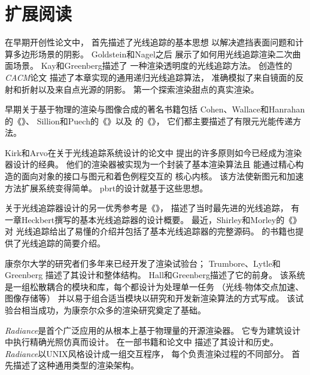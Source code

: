 \section{扩展阅读}\label{sec:扩展阅读1}

在早期开创性论文中，
\citet{10.1145/1468075.1468082}首先描述了光线追踪的基本思想
以解决遮挡表面问题和计算多边形场景的阴影。
Goldstein和Nagel\parencite*{doi:10.1177/003754977101600104}之后
展示了如何用光线追踪渲染二次曲面场景。
Kay和Greenberg\parencite*{10.1145/800249.807438}描述了
一种渲染透明度的光线追踪方法。
\citet{10.1145/358876.358882}创造性的\emph{CACM}论文
描述了本章实现的通用递归光线追踪算法，
准确模拟了来自镜面的反射和折射以及来自点光源的阴影。
\citet{10.1145/37402.37411}第一个探索渲染甜点的真实渲染。

早期关于基于物理的渲染与图像合成的著名书籍包括
Cohen、Wallace和Hanrahan的《》\parencite*{10.5555/154731}、
Sillion和Puech的《》\parencite*{10.5555/561383}以及
\citeauthor{10.5555/200607}的《》\parencite*{10.5555/200607}，
它们都主要描述了有限元光能传递方法。

Kirk和Arvo\parencite*{Kirk88theray}在关于光线追踪系统设计的论文中
提出的许多原则如今已经成为渲染器设计的经典。
他们的渲染器被实现为一个封装了基本渲染算法且
能通过精心构造的面向对象的接口与图元和着色例程交互的
核心内核。
该方法使新图元和加速方法扩展系统变得简单。
pbrt的设计就基于这些思想。

关于光线追踪器设计的另一优秀参考是《》\citep{10.5555/94788}，
描述了当时最先进的光线追踪，
有一章Heckbert撰写的基本光线追踪器的设计概要。
最近，Shirley和Morley的《》\parencite*{10.5555/940410}对
光线追踪给出了易懂的介绍并包括了基本光线追踪器的完整源码。
\citet{10.5555/1324795}的书籍也提供了光线追踪的简要介绍。

康奈尔大学的研究者们多年来已经开发了渲染试验台；
Trumbore、Lytle和Greenberg\parencite*{egtp.19911035}
描述了其设计和整体结构。
Hall和Greenberg\parencite*{4037684}描述了它的前身。
该系统是一组松散耦合的模块和库，每个都设计为处理单一任务
（光线-物体交点加速、图像存储等）
并以易于组合适当模块以研究和开发新渲染算法的方式写成。
该试验台相当成功，为康奈尔众多的渲染研究奠定了基础。

\emph{Radiance}是首个广泛应用的从根本上基于物理量的开源渲染器。
它专为建筑设计中执行精确光照仿真而设计。
\citeauthor{10.1145/192161.192286}在一部书籍和论文中
\citep{10.1145/192161.192286,10.5555/286090}描述了其设计和历史。
\emph{Radiance}以UNIX风格设计成一组交互程序，
每个负责渲染过程的不同部分。
\citet{10.1145/325334.325174}首先描述了这种通用类型的渲染架构。

